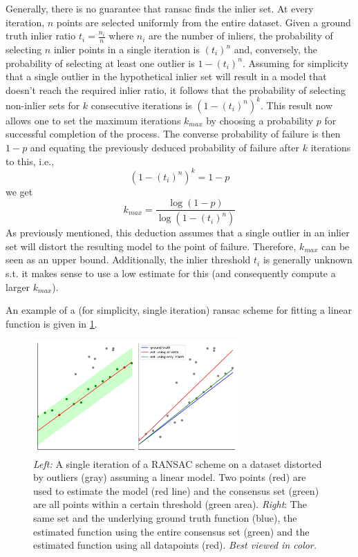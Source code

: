 \documentclass[headsepline, hidelinks, footsepline, footinclude=false, oneside, fontsize=11pt, paper=a4, listof=totoc, bibliography=totoc]{scrbook}
\begin{document}
Generally, there is no guarantee that \gls{ransac} finds the inlier set. At every iteration, \(n\) points are selected uniformly from the entire dataset.
Given a ground truth inlier ratio \(t_i = \frac{n_i}{n}\) where \(n_i\) are the number of inliers, the probability of selecting \(n\) inlier points
in a single iteration is \((t_i)^n\) and, conversely, the probability of selecting at least one outlier is \(1-(t_i)^n\). Assuming for simplicity that a single
outlier in the hypothetical inlier set will result in a model that doesn't reach the required inlier ratio, it follows that the probability of selecting non-inlier sets for \(k\) consecutive iterations is \((1-(t_i)^n)^k\). This result now allows one to set the maximum iterations \(k_{max}\) by choosing a probability \(p\) for
successful completion of the process. The converse probability of failure is then \(1-p\) and equating the previously deduced probability of failure after \(k\) iterations
to this, i.e., 
\begin{equation}
 (1-(t_i)^n)^k=1-p
\end{equation}
we get 
\begin{equation}
k_{max} = \frac{\log(1-p)}{\log(1-(t_i)^n)}
\end{equation}
As previously mentioned, this deduction assumes that a single outlier in an inlier set will distort the resulting model to the point of failure. Therefore, \(k_{max}\) can be seen as an upper bound. Additionally, the inlier threshold \(t_i\) is generally unknown s.t. it makes sense to use a low estimate for this (and consequently compute a larger \(k_{max}\)).


An example of a (for simplicity, single iteration) \gls{ransac} scheme for fitting a linear function is given in \cref{fig:ransac}.

\begin{figure}[htbp]
\centering
\includegraphics[width=0.7\textwidth]{figures/ransac.pdf}
\caption{\label{fig:ransac}\emph{Left:} A single iteration of a RANSAC scheme on a dataset distorted by outliers (gray) assuming a linear model. Two points (red) are used to estimate the model (red line) and the consensus set (green) are all points within a certain threshold (green area). \emph{Right}: The same set and the underlying ground truth function (blue), the estimated function using the entire consensus set (green) and the estimated function using all datapoints (red). \emph{Best viewed in color.}}
\end{figure}
\end{document}
